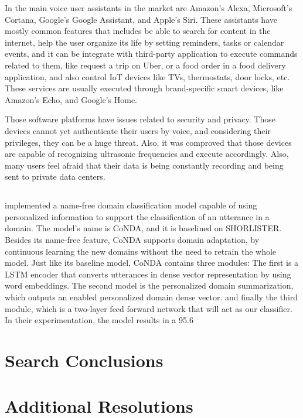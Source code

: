 In \cite{Hoy201881} the main voice user assistants in the market are Amazon's Alexa, Microsoft's Cortana, Google's Google Assistant, and Apple's Siri. These assistants have mostly common features that includes be able to search for content in the internet, help the user organize its life by setting reminders, tasks or calendar events, and it can be integrate with third-party application to execute commands related to them, like request a trip on Uber, or a food order in a food delivery application, and also control IoT devices like TVs, thermostats, door locks, etc. These services are usually executed through brand-specific smart devices, like Amazon's Echo, and Google's Home.

Those software platforms have issues related to security and privacy. Those devices cannot yet authenticate their users by voice, and considering their privileges, they can be a huge threat. Also, it was comproved that those devices are capable of recognizing ultrasonic frequencies and execute accordingly. Also, many users feel afraid that their data is being constantly recording and being sent to private data centers.

\subsection{\RQIII}

\citet{Li20193784} implemented a name-free domain classification model capable of using personalized information to support the classification of an utterance in a domain. The model’s name is CoNDA, and it is baselined on SHORLISTER. Besides its name-free feature, CoNDA supports domain adaptation, by continuous learning the new domains without the need to retrain the whole model. Just like its baseline model, CoNDA contains three modules: The first is a LSTM encoder that converts utterances in dense vector representation by using word embeddings. The second model is the personalized domain summarization, which outputs an enabled personalized domain dense vector. and finally the third module, which is a two-layer feed forward network that will act as our classifier. In their experimentation, the model results in a 95.6%

\section{Search Conclusions}

\subsection{\RQI}

\subsection{\RQII}

\subsection{\RQIII}

\section{Additional Resolutions}




